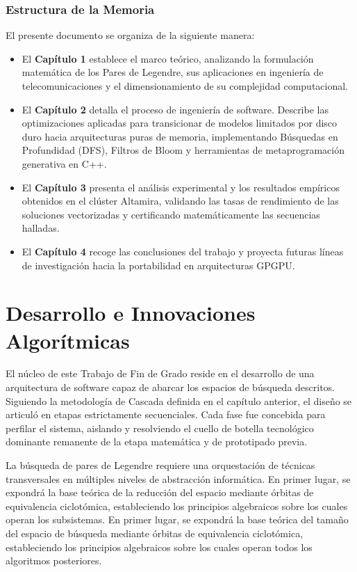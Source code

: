 \documentclass[12pt,a4paper]{tfg_domingo}
\begin{document}
\subsection{Estructura de la Memoria}
El presente documento se organiza de la siguiente manera:
\begin{itemize}
    \item El \textbf{Capítulo 1} establece el marco teórico, analizando la formulación matemática de los Pares de Legendre, sus aplicaciones en ingeniería de telecomunicaciones y el dimensionamiento de su complejidad computacional.
    \item El \textbf{Capítulo 2} detalla el proceso de ingeniería de software. Describe las optimizaciones aplicadas para transicionar de modelos limitados por disco duro hacia arquitecturas puras de memoria, implementando Búsquedas en Profundidad (DFS), Filtros de Bloom y herramientas de metaprogramación generativa en C++.
    \item El \textbf{Capítulo 3} presenta el análisis experimental y los resultados empíricos obtenidos en el clúster Altamira, validando las tasas de rendimiento de las soluciones vectorizadas y certificando matemáticamente las secuencias halladas.
    \item El \textbf{Capítulo 4} recoge las conclusiones del trabajo y proyecta futuras líneas de investigación hacia la portabilidad en arquitecturas GPGPU.
\end{itemize}

\chapter{Desarrollo e Innovaciones Algorítmicas}
\label{cap:desarrollo}
El núcleo de este Trabajo de Fin de Grado reside en el desarrollo de una arquitectura de software capaz de abarcar los espacios de búsqueda descritos. Siguiendo la metodología de Cascada definida en el capítulo anterior, el diseño se articuló en etapas estrictamente secuenciales. Cada fase fue concebida para perfilar el sistema, aislando y resolviendo el cuello de botella tecnológico dominante remanente de la etapa matemática y de prototipado previa.

La búsqueda de pares de Legendre requiere una orquestación de técnicas transversales en múltiples niveles de abstracción informática. En primer lugar, se expondrá la base teórica de la reducción del espacio mediante órbitas de equivalencia ciclotómica, estableciendo los principios algebraicos sobre los cuales operan los subsistemas. En primer lugar, se expondrá la base teórica
del tamaño del espacio de búsqueda mediante órbitas de equivalencia
ciclotómica, estableciendo los principios algebraicos  sobre los
cuales operan todos los algoritmos posteriores.  
\end{document}
